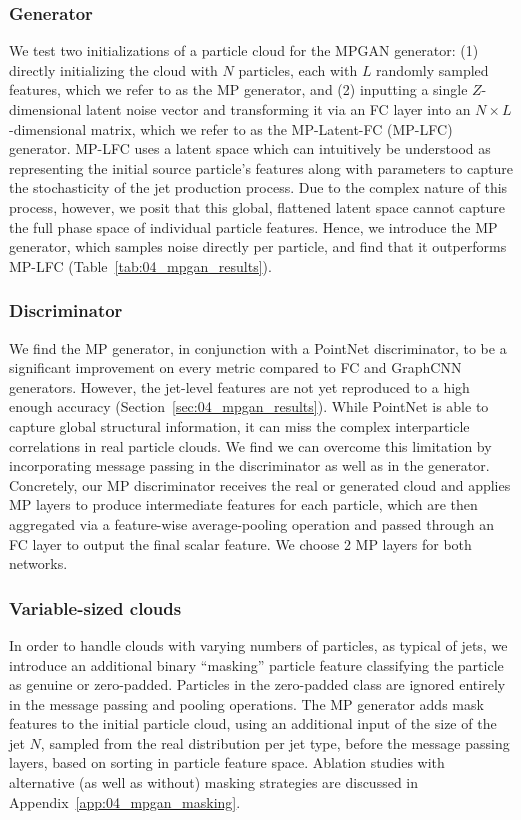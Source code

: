 \subsubsection{Generator}

We test two initializations of a particle cloud for the MPGAN generator: (1) directly initializing the cloud with $N$ particles, each with $L$ randomly sampled features, which we refer to as the MP generator, and (2) inputting a single $Z$-dimensional latent noise vector and transforming it via an FC layer into an $N\times L$-dimensional matrix, which we refer to as the MP-Latent-FC (MP-LFC) generator.
MP-LFC uses a latent space which can intuitively be understood as representing the initial source particle's features along with parameters to capture the stochasticity of the jet production process.
Due to the complex nature of this process, however, we posit that this global, flattened latent space cannot capture the full phase space of individual particle features.
Hence, we introduce the MP generator, which samples noise directly per particle, and find that it outperforms MP-LFC (Table~\ref{tab:04_mpgan_results}).

\subsubsection{Discriminator}

We find the MP generator, in conjunction with a PointNet discriminator, to be a significant improvement on every metric compared to FC and GraphCNN generators.
However, the jet-level features are not yet reproduced to a high enough accuracy (Section~\ref{sec:04_mpgan_results}).
While PointNet is able to capture global structural information, it can miss the complex interparticle correlations in real particle clouds.
We find we can overcome this limitation by incorporating message passing in the discriminator as well as in the generator.
Concretely, our MP discriminator receives the real or generated cloud and applies MP layers to produce intermediate features for each particle, which are then aggregated via a feature-wise average-pooling operation and passed through an FC layer to output the final scalar feature.
We choose 2 MP layers for both networks.

\subsubsection{Variable-sized clouds}

In order to handle clouds with varying numbers of particles, as typical of jets, we introduce an additional binary ``masking'' particle feature classifying the particle as genuine or zero-padded.
Particles in the zero-padded class are ignored entirely in the message passing and pooling operations.
The MP generator adds mask features to the initial particle cloud, using an additional input of the size of the jet $N$, sampled from the real distribution per jet type, before the message passing layers, based on sorting in particle feature space.
Ablation studies with alternative (as well as without) masking strategies are discussed in Appendix~\ref{app:04_mpgan_masking}.

